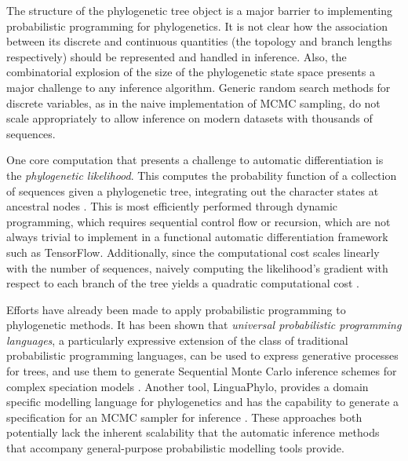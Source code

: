 The structure of the phylogenetic tree object is a major barrier to implementing probabilistic programming for phylogenetics. It is not clear how the association between its discrete and continuous quantities (the topology and branch lengths respectively) should be represented and handled in inference. Also, the combinatorial explosion of the size of the phylogenetic state space presents a major challenge to any inference algorithm. Generic random search methods for discrete variables, as in the naive implementation of MCMC sampling, do not scale appropriately to allow inference on modern datasets with thousands of sequences.

One core computation that presents a challenge to automatic differentiation is the \textit{phylogenetic likelihood}. This computes the probability function of a collection of sequences given a phylogenetic tree, integrating out the character states at ancestral nodes \cite{felsenstein1981evolutionary}. This is most efficiently performed through dynamic programming, which requires sequential control flow or recursion, which are not always trivial to implement in a functional automatic differentiation framework such as TensorFlow. Additionally, since the computational cost scales linearly with the number of sequences, naively computing the likelihood's gradient with respect to each branch of the tree yields a quadratic computational cost \cite{ji2020gradients}.

Efforts have already been made to apply probabilistic programming to phylogenetic methods. It has been shown that \textit{universal probabilistic programming languages}, a particularly expressive extension of the class of traditional probabilistic programming languages, can be used to express generative processes for trees, and use them to generate Sequential Monte Carlo inference schemes for complex speciation models \cite{ronquist2021universal}. Another tool, LinguaPhylo, provides a domain specific modelling language for phylogenetics and has the capability to generate a specification for an MCMC sampler for inference \cite{drummond2022linguaphylo}. These approaches both potentially lack the inherent scalability that the automatic inference methods that accompany general-purpose probabilistic modelling tools provide.

